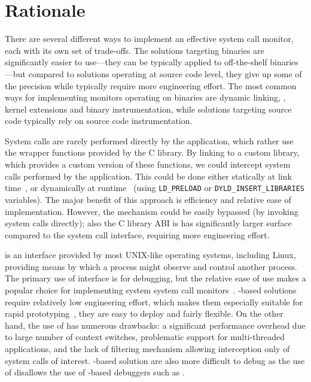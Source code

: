\section{Rationale}
\label{multi-version:rationale}

There are several different ways to implement an effective system call monitor,
each with its own set of trade-offs. The solutions targeting binaries are
significantly easier to use---they can be typically applied to off-the-shelf
binaries---but compared to solutions operating at source code level, they give
up some of the precision while typically require more engineering effort. The
most common ways for implementing monitors operating on binaries are dynamic
linking, \ptrace, kernel extensions and binary instrumentation, while solutions
targeting source code typically rely on source code instrumentation.

System calls are rarely performed directly by the application, which rather use
the wrapper functions provided by the C library. By linking to a custom
library, which provides a custom version of these functions, we could intercept
system calls performed by the application. This could be done either statically
at link time~\cite{plash}, or dynamically at runtime~\cite{shepherding:pldi14}
(\eg using \lstinline`LD_PRELOAD` or \lstinline`DYLD_INSERT_LIBRARIES`
variables). The major benefit of this approach is efficiency and relative ease
of implementation. However, the mechanism could be easily bypassed (\eg by
invoking system calls directly); also the C library ABI is has significantly
larger surface compared to the system call interface, requiring more
engineering effort.

\ptrace is an interface provided by most UNIX-like operating systems, including
Linux, providing means by which a process might observe and control another
process. The primary use of \ptrace interface is for debugging, but the
relative ease of use makes \ptrace a popular choice for implementing system
system call monitors~\cite{wily-hacker,orchestra09,tachyon12}. \ptrace-based
solutions require relatively low engineering effort, which makes them
especially suitable for rapid prototyping~\cite{spillane07}, they are easy to
deploy and fairly flexible. On the other hand, the use of \ptrace has numerous
drawbacks: a significant performance overhead due to large number of context
switches, problematic support for multi-threaded applications, and the lack of
filtering mechanism allowing interception only of system calls of interest.
\ptrace-based solution are also more difficult to debug as the use of \ptrace
disallows the use of \ptrace-based debuggers such as \gdb.

